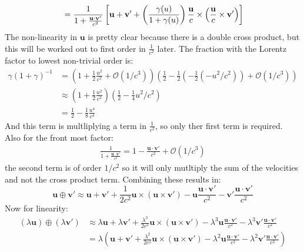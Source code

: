 \documentclass[12pt,a4]{article}
\begin{document}
\begin{enumerate}
\begin{enumerate}
\begin{align*}
                  &= \frac{1}{1 + \frac{{\bf u} \cdot {\bf v}'}{c^2}} \left[ {\bf u} + {\bf v'} + \left(\frac{\gamma(u) }{ 1 + \gamma(u)} \right) \frac{\bf u}{c} \times \left(\frac{\bf u}{c} \times {\bf v}'\right)\right]\\
        \end{align*}
        The non-linearity in $\mathbf{u}$ is pretty clear because there is a double cross product, but this will be worked out to first order in $\frac{1}{c^2}$ later.
        The fraction with the Lorentz factor to lowest non-trivial order is:
        \begin{align*}
          \gamma (1 + \gamma)^{-1} &= \left(1 +\frac{1}{2}\frac{u^2}{c^2} + \mathcal{O}(1/c^3)\right)\left(\frac{1}{2} - \frac{1}{2}(-\frac{1}{2}(-u^2/c^2))+ \mathcal{O}(1/c^3)\right)\\
                                &\approx \left(1 +\frac{1}{2}\frac{u^2}{c^2}\right)\left(\frac{1}{2} - \frac{1}{4}u^2/c^2\right)\\
                                &= \frac{1}{2} -\frac{1}{8}\frac{u^4}{c^4}
        \end{align*}
        And this term is multliplying a term in $\frac{1}{c^2}$, so only ther first term is required.
        Also for the  front most factor:
        \begin{align*}
          \frac{1}{1 + \frac{\mathbf{u}\cdot\mathbf{v'}}{c^2}} = 1 - \frac{\mathbf{u} \cdot \mathbf{v'}}{c^2} + \mathcal{O}(1/c^3)
        \end{align*}
        the second term is of order $1/c^2$ so it will only mutltiply the sum of the velocities and not the cross product term.
        Combining these results in:
        \begin{equation*}
          \mathbf{u}\oplus \mathbf{v'} \approx \mathbf{u} + \mathbf{v}' + \frac{1}{2c^2}\mathbf{u}\times(\mathbf{u} \times \mathbf{v}') - \mathbf{u}\frac{\mathbf{u}\cdot\mathbf{v}'}{c^2} - \mathbf{v}'\frac{\mathbf{u}\cdot\mathbf{v}'}{c^2}
        \end{equation*}
        Now for linearity:
        \begin{align*}
          (\lambda \mathbf{u})\oplus (\lambda \mathbf{v'}) &\approx \lambda\mathbf{u} + \lambda \mathbf{v}' + \frac{\lambda^3}{2c^2}\mathbf{u}\times(\mathbf{u} \times \mathbf{v}') - \lambda^3\mathbf{u}\frac{\mathbf{u}\cdot\mathbf{v}'}{c^2} - \lambda^3\mathbf{v}'\frac{\mathbf{u}\cdot\mathbf{v}'}{c^2}\\
                                                           &=      \lambda\left(\mathbf{u} + \mathbf{v}' + \frac{\lambda^2}{2c^2}\mathbf{u}\times(\mathbf{u} \times \mathbf{v}') - \lambda^2\mathbf{u}\frac{\mathbf{u}\cdot\mathbf{v}'}{c^2} - \lambda^2\mathbf{v}'\frac{\mathbf{u}\cdot\mathbf{v}'}{c^2}\right)\\

\end{align*}
\end{enumerate}
\end{enumerate}
\end{document}
